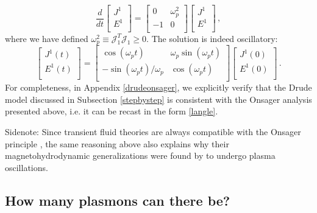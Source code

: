 \documentclass[a4paper, amsfonts, amssymb, amsmath, reprint, showkeys, nofootinbib, twoside,notitlepage,onecolumn]{revtex4-1}
\theoremstyle{definition}
\theoremstyle{theorem}
\begin{document}
\begin{equation}
\dfrac{d}{dt}
\begin{bmatrix}
J^1 \\
E^1 \\
\end{bmatrix}
=
\begin{bmatrix}
0 & \omega_p^2 \\
-1 & 0 \\
\end{bmatrix}
\begin{bmatrix}
J^1 \\
E^1 \\
\end{bmatrix}\, ,
\end{equation}
where we have defined $\omega_p^2\equiv \mathcal{J}_1^T \mathcal{J}_1\geq 0$. The solution is indeed oscillatory:
\begin{equation}
\begin{bmatrix}
J^1(t) \\
E^1(t) \\
\end{bmatrix}
=
\begin{bmatrix}
\cos(\omega_p t) & \omega_p \sin(\omega_p t) \\
-\sin(\omega_p t)/\omega_p & \cos(\omega_p t) \\
\end{bmatrix}
\begin{bmatrix}
J^1(0) \\
E^1(0) \\
\end{bmatrix}\, .
\end{equation}
For completeness, in Appendix \ref{drudeonsager}, we explicitly verify that the Drude model discussed in Subsection \ref{stepbystep} is consistent with the Onsager analysis presented above, i.e. it can be recast in the form \eqref{langle}.

Sidenote: Since transient fluid theories are always compatible with the Onsager principle \cite{GavassinoSymmetric2022nff,GavassinoUniveraalityI2023odx}, the same reasoning above also explains why their magnetohydrodynamic generalizations were found by \cite{Dash:2022xkz} to undergo plasma oscillations.



\subsection{How many plasmons can there be?}\label{iiic}
\end{document}
